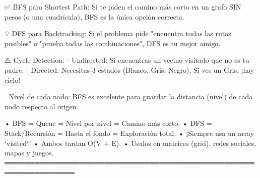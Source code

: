 \begin{dsaentrevistas}

✅ BFS para Shortest Path: Si te piden el camino más corto en un grafo
   SIN pesos (o una cuadrícula), BFS es la única opción correcta.

💡 DFS para Backtracking: Si el problema pide "encuentra todas las 
   rutas posibles" o "prueba todas las combinaciones", DFS es tu mejor
   amigo.

⚠️ Cycle Detection: 
   - Undirected: Si encuentras un vecino visitado que no es tu padre.
   - Directed: Necesitas 3 estados (Blanco, Gris, Negro). Si ves un 
     Gris, ¡hay ciclo!

🔑 Nivel de cada nodo: BFS es excelente para guardar la distancia 
   (nivel) de cada nodo respecto al origen.

\end{dsaentrevistas}

\begin{dsaresumen}

• BFS = Queue = Nivel por nivel = Camino más corto.
• DFS = Stack/Recursión = Hasta el fondo = Exploración total.
• ¡Siempre usa un array `visited`!
• Ambos tardan O(V + E).
• Úsalos en matrices (grid), redes sociales, mapas y juegos.
════════════════════════════════════════════════════════════════

\end{dsaresumen}


